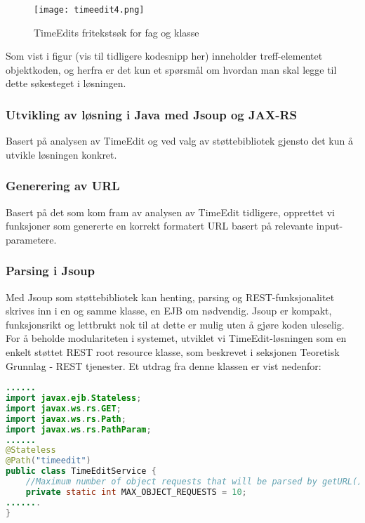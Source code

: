 \documentclass[../main.tex]{subfiles}
\begin{document}
\begin{figure}[H]
  \centering
  \texttt{[image: timeedit4.png]}
  \caption{TimeEdits fritekstsøk for fag og klasse}
\end{figure}

Som vist i figur (vis til tidligere kodesnipp her) inneholder treff-elementet objektkoden, og herfra er det kun et spørsmål om hvordan man skal legge til dette søkesteget i løsningen.

\subsubsection{Utvikling av løsning i Java med Jsoup og JAX-RS}

Basert på analysen av TimeEdit og ved valg av støttebibliotek gjensto det kun å utvikle løsningen konkret. 

\subsubsection{Generering av URL}

Basert på det som kom fram av analysen av TimeEdit tidligere, opprettet vi funksjoner som genererte en korrekt formatert URL basert på relevante input-parametere.

\subsubsection{Parsing i Jsoup}
Med Jsoup som støttebibliotek kan henting, parsing og REST-funksjonalitet skrives inn i en og samme klasse, en EJB om nødvendig. Jsoup er kompakt, funksjonsrikt og lettbrukt nok til at dette er mulig uten å gjøre koden uleselig. For å beholde modulariteten i systemet, utviklet vi TimeEdit-løsningen som en enkelt støttet REST root resource klasse, som beskrevet i seksjonen Teoretisk Grunnlag - REST tjenester. Et utdrag fra denne klassen er vist nedenfor:

\begin{lstlisting}[language=Java, frame=single, caption={Kodesnipp fra klassen TimeEditService, som er grovt kortet ned.}]
......
import javax.ejb.Stateless;
import javax.ws.rs.GET;
import javax.ws.rs.Path;
import javax.ws.rs.PathParam;
......
@Stateless
@Path("timeedit")
public class TimeEditService {
    //Maximum number of object requests that will be parsed by getURL()
    private static int MAX_OBJECT_REQUESTS = 10;
.......
}
\end{lstlisting}
\end{document}
